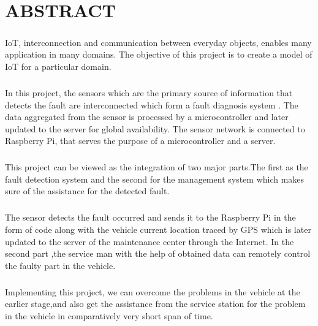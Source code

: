 \vspace{0.5cm}
\chapter*{\centering ABSTRACT}
	\thispagestyle{plain}
	\paragraph{} IoT, interconnection and communication between everyday objects, enables many application in many domains. The objective of this project is to create a model of IoT for a particular domain.
	
	\paragraph{} In this project, the sensors which are the primary source of information that detects the fault are interconnected which form a fault diagnosis system . The data aggregated from the sensor is processed by a microcontroller and later updated  to the server for global availability. The sensor network is connected to Raspberry Pi, that serves the purpose of a microcontroller and a server.
	
	\paragraph{} This project can be viewed as the integration of two major parts.The first as the fault detection system and the second for the management system which makes sure of the assistance for the detected fault.
	
	\paragraph{} The sensor detects the fault occurred and sends it to the Raspberry Pi in the form of code along with the vehicle current location traced by GPS  which is later updated to the server of the maintenance center through the Internet. In the second part ,the service man with the help of obtained data can remotely control the faulty part in the vehicle.
	
	\paragraph{} Implementing this project, we can overcome the problems in the vehicle at the earlier stage,and also get the assistance from the service station for the problem in the vehicle in comparatively very short span of time.
	
	\newpage
	